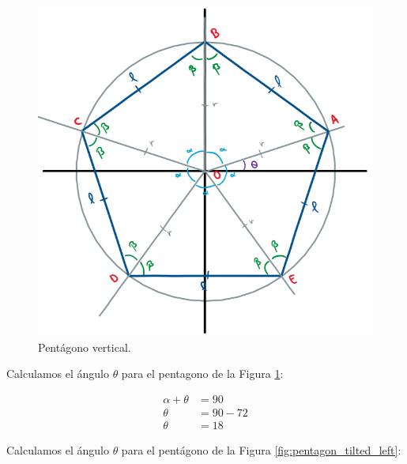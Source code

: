 \documentclass[oneside, a4paper]{article}
\begin{document}
            \begin{figure}[H]
                \centering
                \includegraphics[scale=0.5]{vertical_pentagon.png}
                \caption{Pentágono vertical.}
                \label{fig:vertical_pentagon}
            \end{figure}

            Calculamos el ángulo $\theta$ para el pentagono de la Figura \ref{fig:vertical_pentagon}:

            \begin{align}
                \alpha + \theta & = 90 \nonumber\\
                \theta & = 90 - 72 \nonumber\\
                \theta & = 18 \label{eq:theta_angle_vertical_pentagon}
            \end{align}

            Calculamos el ángulo $\theta$ para el pentágono de la Figura \ref{fig:pentagon_tilted_left}:
\end{document}
